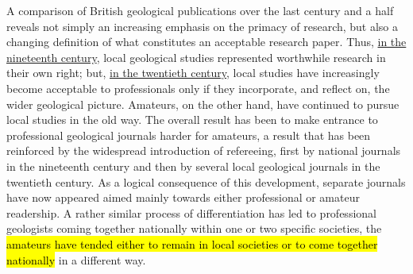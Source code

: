 A comparison of British geological publications over the last century and a half 
reveals not simply an increasing emphasis on the 
primacy of research, but also a changing definition of what 
constitutes an acceptable research paper. Thus, \underline{in the nineteenth century}, local geological studies represented worthwhile research in their own right; but, \underline{in the twentieth century}, local studies have increasingly become acceptable to professionals only if they incorporate, and reflect on, the wider geological picture. Amateurs, on the other hand, have continued to pursue local studies in the old way. The overall result has been to make entrance to professional geological journals harder for amateurs, a result that has been reinforced by the widespread introduction of 
refereeing, first by national journals in the nineteenth century and then by several local geological journals in the twentieth century. As a logical consequence of this development, separate journals have now appeared aimed mainly towards either professional or amateur readership. A rather similar process of differentiation has led to professional geologists coming together nationally within one or two specific societies, 
 the 
\hl{amateurs have tended either to remain in local societies or to come together nationally} in a different way.

